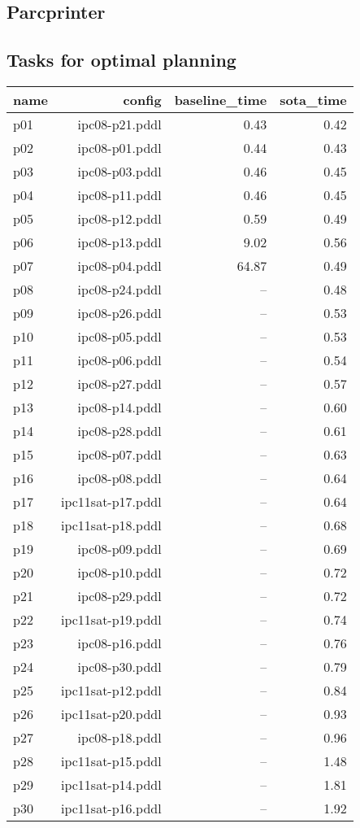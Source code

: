 \documentclass{article}
\begin{document}
                \newpage \subsection{Parcprinter}
                    \subsection*{Tasks for optimal planning}
                    
                            \begin{center}
                            \scriptsize
                            \begin{tabular}{@{}l|r|r|r@{}}
                            name & config & baseline\_time & sota\_time\\\midrule
                              p01& ipc08-p21.pddl&0.43&0.42\\
  p02& ipc08-p01.pddl&0.44&0.43\\
  p03& ipc08-p03.pddl&0.46&0.45\\
  p04& ipc08-p11.pddl&0.46&0.45\\
  p05& ipc08-p12.pddl&0.59&0.49\\
  p06& ipc08-p13.pddl&9.02&0.56\\
  p07& ipc08-p04.pddl&64.87&0.49\\
  p08& ipc08-p24.pddl&--&0.48\\
  p09& ipc08-p26.pddl&--&0.53\\
  p10& ipc08-p05.pddl&--&0.53\\
  p11& ipc08-p06.pddl&--&0.54\\
  p12& ipc08-p27.pddl&--&0.57\\
  p13& ipc08-p14.pddl&--&0.60\\
  p14& ipc08-p28.pddl&--&0.61\\
  p15& ipc08-p07.pddl&--&0.63\\
  p16& ipc08-p08.pddl&--&0.64\\
  p17& ipc11sat-p17.pddl&--&0.64\\
  p18& ipc11sat-p18.pddl&--&0.68\\
  p19& ipc08-p09.pddl&--&0.69\\
  p20& ipc08-p10.pddl&--&0.72\\
  p21& ipc08-p29.pddl&--&0.72\\
  p22& ipc11sat-p19.pddl&--&0.74\\
  p23& ipc08-p16.pddl&--&0.76\\
  p24& ipc08-p30.pddl&--&0.79\\
  p25& ipc11sat-p12.pddl&--&0.84\\
  p26& ipc11sat-p20.pddl&--&0.93\\
  p27& ipc08-p18.pddl&--&0.96\\
  p28& ipc11sat-p15.pddl&--&1.48\\
  p29& ipc11sat-p14.pddl&--&1.81\\
  p30& ipc11sat-p16.pddl&--&1.92
                            \end{tabular}
                            \end{center}
                    
\end{document}
